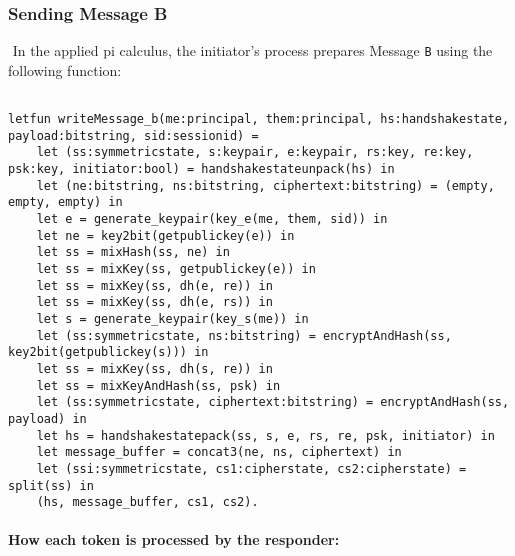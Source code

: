 \subsubsection{Sending Message B}$ $
In the applied pi calculus, the initiator's process prepares Message \texttt{B} using the following function:


\begin{lstlisting}

letfun writeMessage_b(me:principal, them:principal, hs:handshakestate, payload:bitstring, sid:sessionid) =
	let (ss:symmetricstate, s:keypair, e:keypair, rs:key, re:key, psk:key, initiator:bool) = handshakestateunpack(hs) in
	let (ne:bitstring, ns:bitstring, ciphertext:bitstring) = (empty, empty, empty) in
	let e = generate_keypair(key_e(me, them, sid)) in
	let ne = key2bit(getpublickey(e)) in
	let ss = mixHash(ss, ne) in
	let ss = mixKey(ss, getpublickey(e)) in
	let ss = mixKey(ss, dh(e, re)) in
	let ss = mixKey(ss, dh(e, rs)) in
	let s = generate_keypair(key_s(me)) in
	let (ss:symmetricstate, ns:bitstring) = encryptAndHash(ss, key2bit(getpublickey(s))) in
	let ss = mixKey(ss, dh(s, re)) in
	let ss = mixKeyAndHash(ss, psk) in
	let (ss:symmetricstate, ciphertext:bitstring) = encryptAndHash(ss, payload) in
	let hs = handshakestatepack(ss, s, e, rs, re, psk, initiator) in
	let message_buffer = concat3(ne, ns, ciphertext) in
	let (ssi:symmetricstate, cs1:cipherstate, cs2:cipherstate) = split(ss) in
	(hs, message_buffer, cs1, cs2).

\end{lstlisting}

\paragraph{How each token is processed by the responder:}$ $

